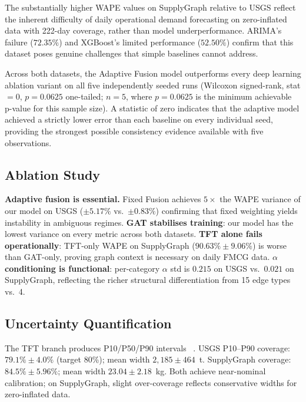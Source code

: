 The substantially higher WAPE values on SupplyGraph relative to USGS
reflect the inherent difficulty of daily operational demand forecasting
on zero-inflated data with 222-day coverage, rather than model
underperformance. ARIMA's failure ($72.35\%$) and XGBoost's limited
performance ($52.50\%$) confirm that this dataset poses genuine
challenges that simple baselines cannot address.

Across both datasets, the Adaptive Fusion model outperforms every
deep learning ablation variant on all five independently seeded runs
(Wilcoxon signed-rank, stat$=0$, $p=0.0625$ one-tailed; $n=5$,
where $p=0.0625$ is the minimum achievable p-value for this sample
size). A statistic of zero indicates that the adaptive model achieved
a strictly lower error than each baseline on every individual seed,
providing the strongest possible consistency evidence available with
five observations.

\subsection{Ablation Study}

\textbf{Adaptive fusion is essential.} Fixed Fusion achieves
$5{\times}$ the WAPE variance of our model on USGS ($\pm5.17\%$
vs.\ $\pm0.83\%$) confirming that fixed weighting yields instability
in ambiguous regimes.
\textbf{GAT stabilises training}: our model has the lowest variance
on every metric across both datasets.
\textbf{TFT alone fails operationally}: TFT-only WAPE on
SupplyGraph ($90.63\%{\pm}9.06\%$) is worse than GAT-only, proving
graph context is necessary on daily FMCG data.
\textbf{$\alpha$ conditioning is functional}: per-category $\alpha$
std is $0.215$ on USGS vs.\ $0.021$ on SupplyGraph, reflecting the
richer structural differentiation from 15 edge types vs.\ 4.

\subsection{Uncertainty Quantification}

The TFT branch produces P10/P50/P90 intervals~%
\cite{wen2017quantile,gneiting2007scoring}.
USGS P10--P90 coverage: $79.1\%{\pm}4.0\%$ (target 80\%); mean
width $2{,}185{\pm}464$~t. SupplyGraph coverage: $84.5\%{\pm}5.96\%$;
mean width $23.04{\pm}2.18$~kg. Both achieve near-nominal
calibration; on SupplyGraph, slight over-coverage reflects
conservative widths for zero-inflated data.


